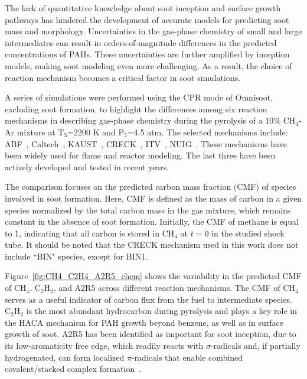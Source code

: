 The lack of quantitative knowledge about soot inception and surface growth pathways has hindered the development of accurate models for predicting soot mass and morphology. Uncertainties in the gas-phase chemistry of small and large intermediates can result in orders-of-magnitude differences in the predicted concentrations of PAHs. These uncertainties are further amplified by inception models, making soot modeling even more challenging. As a result, the choice of reaction mechanism becomes a critical factor in soot simulations.

A series of simulations were performed using the CPR mode of Omnisoot, excluding soot formation, to highlight the differences among six reaction mechanisms in describing gas-phase chemistry during the pyrolysis of a $10\%$ $\mathrm{CH_4}$-Ar mixture at $\mathrm{T_5}$=2200 K and $\mathrm{P_5}$=4.5 atm. The selected mechanisms include: ABF~\citep{appel2000kinetic}, Caltech~\citep{blanquart2009chemical}, KAUST~\citep{wang2013pah}, CRECK~\citep{saggese2015kinetic}, ITV~\citep{hellmuth2024role}, NUIG~\citep{zhu2023wide}. These mechanisms have been widely used for flame and reactor modeling. The last three have been actively developed and tested in recent years. 

The comparison focuses on the predicted carbon mass fraction (CMF) of species involved in soot formation. Here, CMF is defined as the mass of carbon in a given species normalized by the total carbon mass in the gas mixture, which remains constant in the absence of soot formation. Initially, the CMF of methane is equal to 1, indicating that all carbon is stored in $\mathrm{CH_4}$ at $t = 0$ in the studied shock tube. It should be noted that the CRECK mechanism used in this work does not include ``BIN" species, except for BIN1.


Figure~\ref{fig:CH4_C2H4_A2R5_chem} shows the variability in the predicted CMF of $\mathrm{CH_4}$, $\mathrm{C_2H_2}$, and A2R5 across different reaction mechanisms. The CMF of $\mathrm{CH_4}$ serves as a useful indicator of carbon flux from the fuel to intermediate species. $\mathrm{C_2H_2}$ is the most abundant hydrocarbon during pyrolysis and plays a key role in the HACA mechanism for PAH growth beyond benzene, as well as in surface growth of soot. A2R5 has been identified as important for soot inception, due to its low-aromaticity free edge, which readily reacts with $\sigma$-radicals and, if partially hydrogenated, can form localized $\pi$-radicals that enable combined covalent/stacked complex formation~\citep{martin2019reactivity}.

